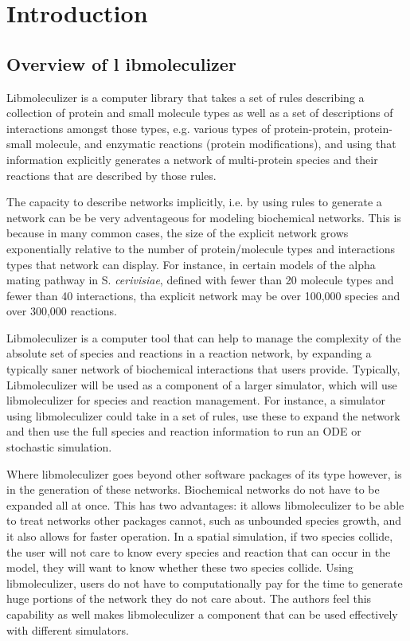 \chapter{Introduction}
\label{chap:introduction}

\section{Overview of l ibmoleculizer}
Libmoleculizer is a computer library that takes a set of rules
describing a collection of protein and small molecule types as well as
a set of descriptions of interactions amongst those types,
e.g. various types of protein-protein, protein-small molecule, and
enzymatic reactions (protein modifications), and using that
information explicitly generates a network of multi-protein species
and their reactions that are described by those rules.

The capacity to describe networks implicitly, i.e. by using rules to
generate a network can be be very adventageous for modeling
biochemical networks.  This is because in many common cases, the size
of the explicit network grows exponentially relative to the number of
protein/molecule types and interactions types that network can
display.  For instance, in certain models of the alpha mating pathway
in S. {\it cerivisiae}, defined with fewer than 20 molecule types and
fewer than 40 interactions, tha explicit network may be over 100,000
species and over 300,000 reactions.  

Libmoleculizer is a computer tool that can help to manage the
complexity of the absolute set of species and reactions in a reaction
network, by expanding a typically saner network of biochemical
interactions that users provide.  Typically, Libmoleculizer will be
used as a component of a larger simulator, which will use
libmoleculizer for species and reaction management.  For instance, a
simulator using libmoleculizer could take in a set of rules, use these
to expand the network and then use the full species and reaction
information to run an ODE or stochastic simulation.  

Where libmoleculizer goes beyond other software packages of its type
however, is in the generation of these networks.  Biochemical networks
do not have to be expanded all at once.  This has two advantages: it
allows libmoleculizer to be able to treat networks other packages
cannot, such as unbounded species growth, and it also allows for
faster operation.  In a spatial simulation, if two species collide,
the user will not care to know every species and reaction that can
occur in the model, they will want to know whether these two species
collide.  Using libmoleculizer, users do not have to computationally
pay for the time to generate huge portions of the network they do not
care about.  The authors feel this capability as well makes
libmoleculizer a component that can be used effectively with different
simulators.

